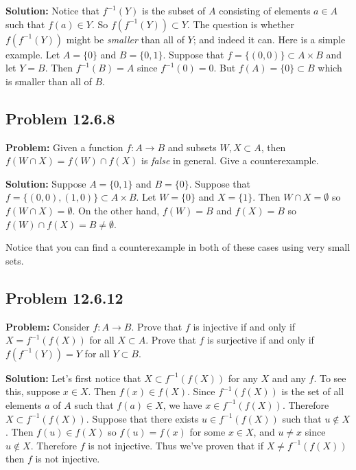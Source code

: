 \documentclass[
]{article}
\begin{document}
\textbf{Solution:} Notice that \(f^{-1}(Y)\) is the subset of \(A\)
consisting of elements \(a\in A\) such that \(f(a)\in Y\). So
\(f(f^{-1}(Y))\subset Y\). The question is whether \(f(f^{-1}(Y))\)
might be \emph{smaller} than all of \(Y\); and indeed it can. Here is a
simple example. Let \(A=\{0\}\) and \(B=\{0,1\}\). Suppose that
\(f=\{(0,0)\}\subset A\times B\) and let \(Y=B\). Then \(f^{-1}(B)=A\)
since \(f^{-1}(0)=0\). But \(f(A)=\{0\}\subset B\) which is smaller than
all of \(B\).

\hypertarget{problem-12.6.8}{%
\subsection{Problem 12.6.8}\label{problem-12.6.8}}

\textbf{Problem:} Given a function \(f:A\to B\) and subsets
\(W,X\subset A\), then \(f(W\cap X)=f(W)\cap f(X)\) is \emph{false} in
general. Give a counterexample.

\textbf{Solution:} Suppose \(A=\{0,1\}\) and \(B=\{0\}\). Suppose that
\(f=\{(0,0),(1,0)\}\subset A\times B\). Let \(W=\{0\}\) and \(X=\{1\}\).
Then \(W\cap X=\emptyset\) so \(f(W\cap X)=\emptyset\). On the other
hand, \(f(W)=B\) and \(f(X)=B\) so \(f(W)\cap f(X)=B\not=\emptyset\).

Notice that you can find a counterexample in both of these cases using
very small sets.

\hypertarget{problem-12.6.12}{%
\subsection{Problem 12.6.12}\label{problem-12.6.12}}

\textbf{Problem:} Consider \(f:A\to B\). Prove that \(f\) is injective
if and only if \(X=f^{-1}(f(X))\) for all \(X\subset A\). Prove that
\(f\) is surjective if and only if \(f(f^{-1}(Y))=Y\) for all
\(Y\subset B\).

\textbf{Solution:} Let's first notice that \(X\subset f^{-1}(f(X))\) for
any \(X\) and any \(f\). To see this, suppose \(x\in X\). Then
\(f(x)\in f(X)\). Since \(f^{-1}(f(X))\) is the set of all elements
\(a\) of \(A\) such that \(f(a)\in X\), we have \(x\in f^{-1}(f(X))\).
Therefore \(X\subset f^{-1}(f(X))\). Suppose that there exists
\(u\in f^{-1}(f(X))\) such that \(u\not\in X\). Then \(f(u)\in f(X)\) so
\(f(u)=f(x)\) for some \(x\in X\), and \(u\not=x\) since \(u\not\in X\).
Therefore \(f\) is not injective. Thus we've proven that if
\(X\not=f^{-1}(f(X))\) then \(f\) is not injective.
\end{document}
